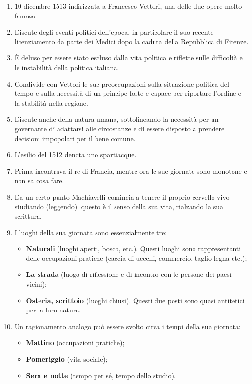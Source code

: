 \documentclass{article}
\begin{document}
\begin{enumerate}
    \item 10 dicembre 1513 indirizzata a Francesco Vettori, una delle due opere molto famosa.
    \item Discute degli eventi politici dell’epoca, in particolare il suo recente licenziamento da parte dei Medici dopo la caduta della Repubblica di Firenze.
    \item È deluso per essere stato escluso dalla vita politica e riflette sulle difficoltà e le instabilità della politica italiana.
    \item Condivide con Vettori le sue preoccupazioni sulla situazione politica del tempo e sulla necessità di un principe forte e capace per riportare l’ordine e la stabilità nella regione.
    \item Discute anche della natura umana, sottolineando la necessità per un governante di adattarsi alle circostanze e di essere disposto a prendere decisioni impopolari per il bene comune.
    \item L’esilio del 1512 denota uno spartiacque.
    \item Prima incontrava il re di Francia, mentre ora le sue giornate sono monotone e non sa cosa fare.
    \item Da un certo punto Machiavelli comincia a tenere il proprio cervello vivo studiando (leggendo): questo è il senso della sua vita, rialzando la sua scrittura.
    \item I luoghi della sua giornata sono essenzialmente tre:
    \begin{itemize}
        \item \textbf{Naturali} (luoghi aperti, bosco, etc.). Questi luoghi sono rappresentanti delle occupazioni pratiche (caccia di uccelli, commercio, taglio legna etc.);
        \item \textbf{La strada} (luogo di riflessione e di incontro con le persone dei paesi vicini);
        \item \textbf{Osteria, scrittoio} (luoghi chiusi). Questi due posti sono quasi antitetici per la loro natura.
    \end{itemize}
    \item Un ragionamento analogo può essere svolto circa i tempi della sua giornata:
    \begin{itemize}
        \item \textbf{Mattino} (occupazioni pratiche);
        \item \textbf{Pomeriggio} (vita sociale);
        \item \textbf{Sera e notte} (tempo per sé, tempo dello studio).

\end{itemize}
\end{enumerate}
\end{document}
